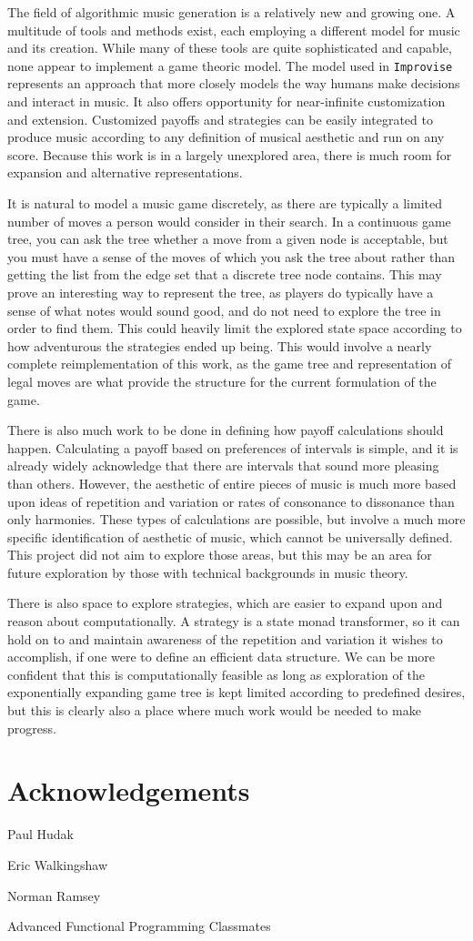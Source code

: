 \documentclass{article}
\begin{document}
The field of algorithmic music generation is a relatively new and
growing one. A multitude of tools and methods exist, each employing a
different model for music and its creation. While many of these tools
are quite sophisticated and capable, none appear to implement a game
theoric model. The model used in \texttt{Improvise} represents an approach
that more closely models the way humans make decisions and interact in
music. It also offers opportunity for near-infinite customization and
extension. Customized payoffs and strategies can be easily integrated to
produce music according to any definition of musical aesthetic and run
on any score. Because this work is in a largely unexplored area, there
is much room for expansion and alternative representations.

It is natural to model a music game discretely, as there are
typically a limited number of moves a person would consider in their
search. In a continuous game tree, you can ask the tree
whether a move from a given node is acceptable, but you must have a
sense of the moves of which you ask the tree about rather than getting
the list from the edge set that a discrete tree node contains. This may
prove an interesting way to represent the tree, as players do typically
have a sense of what notes would sound good, and do not need to explore
the tree in order to find them. This could heavily limit the explored
state space according to how adventurous the strategies ended up being.
This would involve a nearly complete reimplementation of this work,
as the game tree and representation of legal moves are what provide the
structure for the current formulation of the game.

There is also much work to be done in defining how payoff calculations
should happen. Calculating a payoff based on preferences of intervals is
simple, and it is already widely acknowledge that there are intervals
that sound more pleasing than others. However, the aesthetic of entire
pieces of music is much more based upon ideas of repetition and
variation or rates of consonance to dissonance than only harmonies.
These types of calculations are possible, but involve a much more
specific identification of aesthetic of music, which cannot be universally
defined. This project did not aim to explore those areas, but this
may be an area for future exploration by those with technical
backgrounds in music theory.

There is also space to explore strategies, which are easier to expand upon and reason
about computationally. A strategy is a state monad
transformer, so it can hold on to and maintain awareness of the
repetition and variation it wishes to accomplish, if one were to define
an efficient data structure. We can be more confident that this is
computationally feasible as long as exploration of the exponentially
expanding game tree is kept limited according to predefined desires, but
this is clearly also a place where much work would be needed to make
progress.

\section{Acknowledgements}

Paul Hudak

Eric Walkingshaw

Norman Ramsey

Advanced Functional Programming Classmates
\end{document}
